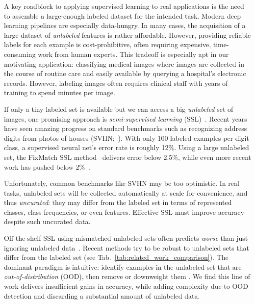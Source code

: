 A key roadblock to applying supervised learning to real applications is the need to assemble a large-enough labeled dataset for the intended task.
Modern deep learning pipelines are especially data-hungry.
In many cases, the acquisition of a large dataset of \emph{unlabeled} features is rather affordable.
However, providing reliable labels for each example is cost-prohibitive, often requiring expensive, time-consuming work from human experts.
This tradeoff is especially apt in our motivating application: classifying medical images where
images are collected in the course of routine care and easily available by querying a hospital's electronic records.
However, labeling images often requires clinical staff with years of training to spend minutes per image.

If only a tiny labeled set is available but we can access a big \emph{unlabeled} set of images, one promising approach is \emph{semi-supervised learning} (SSL)~\citep{zhuSemiSupervisedLearningLiterature2005,vanengelenSurveySemisupervisedLearning2020}. 
Recent years have seen amazing progress on standard benchmarks such as recognizing address digits from photos of houses (SVHN;~\citet{netzerReadingDigitsNatural2011}).
With only 100 labeled examples per digit class, a supervised neural net's error rate is roughly 12\%. 
Using a large unlabeled set, the FixMatch SSL method~\citep{sohnFixMatchSimplifyingSemisupervised2020} delivers error below 2.5\%, while even more recent work has pushed below 2\%~\citep{xuDPSSLRobustSemisupervised2021, hanUnsupervisedSemanticAggregation2020}.

Unfortunately, common benchmarks like SVHN may be too optimistic. 
In real tasks, unlabeled sets will be collected automatically at scale for convenience, and thus \emph{uncurated}: they may differ from the labeled set in terms of represented classes, class frequencies, or even features.
Effective SSL must improve accuracy despite such uncurated data.

Off-the-shelf SSL using mismatched unlabeled sets often predicts \emph{worse} than just ignoring unlabeled data~\citep{oliverRealisticEvaluationDeep2018,calderon-ramirezDealingScarceLabelled2021}.
Recent methods try to be robust to unlabeled sets that differ from the labeled set (see Tab.~\ref{tab:related_work_comparison}).
The dominant paradigm is intuitive: 
identify examples in the unlabeled set that are \emph{out-of-distribution} (OOD), then remove or downweight them \citep{calderon2022semi,chen2022semi, he2022not}.
We find this line of work delivers insufficient gains in accuracy, while adding complexity due to OOD detection and discarding a substantial amount of unlabeled data.

